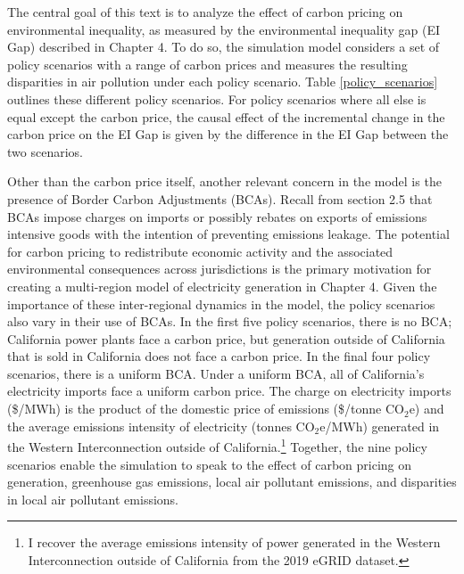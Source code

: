 The central goal of this text is to analyze the effect of carbon pricing on environmental inequality, as measured by the environmental inequality gap (EI Gap) described in Chapter 4. To do so, the simulation model considers a set of policy scenarios with a range of carbon prices and measures the resulting disparities in air pollution under each policy scenario. Table \ref{policy_scenarios} outlines these different policy scenarios. For policy scenarios where all else is equal except the carbon price, the causal effect of the incremental change in the carbon price on the EI Gap is given by the difference in the EI Gap between the two scenarios. 

Other than the carbon price itself, another relevant concern in the model is the presence of Border Carbon Adjustments (BCAs). Recall from section 2.5 that BCAs impose charges on imports or possibly rebates on exports of emissions intensive goods with the intention of preventing emissions leakage. The potential for carbon pricing to redistribute economic activity and the associated environmental consequences across jurisdictions is the primary motivation for creating a multi-region model of electricity generation in Chapter 4. Given the importance of these inter-regional dynamics in the model, the policy scenarios also vary in their use of BCAs. In the first five policy scenarios, there is no BCA; California power plants face a carbon price, but generation outside of California that is sold in California does not face a carbon price. In the final four policy scenarios, there is a uniform BCA. Under a uniform BCA, all of California's electricity imports face a uniform carbon price. The charge on electricity imports (\$/MWh) is the product of the domestic price of emissions (\$/tonne CO$_2$e) and the average emissions intensity of electricity (tonnes CO$_2$e/MWh) generated in the Western Interconnection outside of California.\footnote{I recover the average emissions intensity of power generated in the Western Interconnection outside of California from the 2019 eGRID dataset.} Together, the nine policy scenarios enable the simulation to speak to the effect of carbon pricing on generation, greenhouse gas emissions, local air pollutant emissions, and disparities in local air pollutant emissions.

